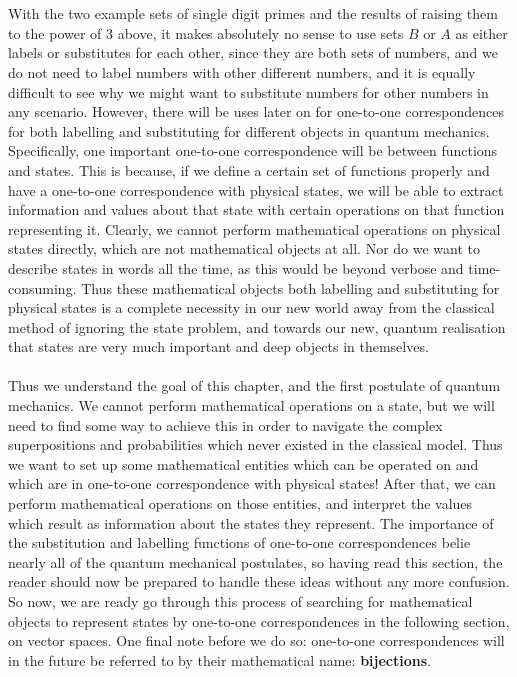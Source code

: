 \\\\
With the two example sets of single digit primes and the results of raising them to the power of 3  above, it makes absolutely no sense to use sets $B$ or $A$ as either labels or substitutes for each other, since they are both sets of numbers, and we do not need to label numbers with other different numbers, and it is equally difficult to see why we might want to substitute numbers for other numbers in any scenario. However, there will be uses later on for one-to-one correspondences for both labelling and substituting for different objects in quantum mechanics. Specifically, one important one-to-one correspondence will be between functions and states. This is because, if we define a certain set of functions properly and have a one-to-one correspondence with physical states, we will be able to extract information and values about that state with certain operations on that function representing it. Clearly, we cannot perform mathematical operations on physical states directly, which are not mathematical objects at all. Nor do we want to describe states in words all the time, as this would be beyond verbose and time-consuming. Thus these mathematical objects both labelling and substituting for physical states is a complete necessity in our new world away from the classical method of ignoring the state problem, and towards our new, quantum realisation that states are very much important and deep objects in themselves.
\\\\
Thus we understand the goal of this chapter, and the first postulate of quantum mechanics. We cannot perform mathematical operations on a state, but we will need to find some way to achieve this in order to navigate the complex superpositions and probabilities which never existed in the classical model. Thus we want to set up some mathematical entities which can be operated on and which are in one-to-one correspondence with physical states! After that, we can perform mathematical operations on those entities, and interpret the values which result as information about the states they represent. The importance of the substitution and labelling functions of one-to-one correspondences belie nearly all of the quantum mechanical postulates, so having read this section, the reader should now be prepared to handle these ideas without any more confusion. So now, we are ready go through this process of searching for mathematical objects to represent states by one-to-one correspondences in the following section, on vector spaces. One final note before we do so: one-to-one correspondences will in the future be referred to by their mathematical name: \textbf{bijections}.
